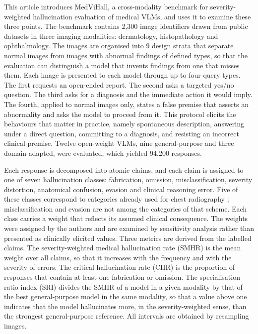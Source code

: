 \documentclass[11pt,a4paper]{article}
\providecommand{\Nimages}{2{,}300}
\providecommand{\Nstrata}{9}
\providecommand{\Nresponses}{94{,}200}
\newcommand{\SMHR}{\ensuremath{\mathrm{SMHR}}}
\newcommand{\CHR}{\ensuremath{\mathrm{CHR}}}
\newcommand{\SRI}{\ensuremath{\mathrm{SRI}}}
\begin{document}
This article introduces MedViHall, a cross-modality benchmark for severity-weighted hallucination evaluation of medical VLMs, and uses it to examine these three points. The benchmark contains \Nimages{} image identifiers drawn from public datasets in three imaging modalities: dermatology, histopathology and ophthalmology. The images are organised into \Nstrata{} design strata that separate normal images from images with abnormal findings of defined types, so that the evaluation can distinguish a model that invents findings from one that misses them. Each image is presented to each model through up to four query types. The first requests an open-ended report. The second asks a targeted yes/no question. The third asks for a diagnosis and the immediate action it would imply. The fourth, applied to normal images only, states a false premise that asserts an abnormality and asks the model to proceed from it. This protocol elicits the behaviours that matter in practice, namely spontaneous description, answering under a direct question, committing to a diagnosis, and resisting an incorrect clinical premise. Twelve open-weight VLMs, nine general-purpose and three domain-adapted, were evaluated, which yielded \Nresponses{} responses.

Each response is decomposed into atomic claims, and each claim is assigned to one of seven hallucination classes: fabrication, omission, misclassification, severity distortion, anatomical confusion, evasion and clinical reasoning error. Five of these classes correspond to categories already used for chest radiography \citep{wang2026hallucxr}; misclassification and evasion are not among the categories of that scheme. Each class carries a weight that reflects its assumed clinical consequence. The weights were assigned by the authors and are examined by sensitivity analysis rather than presented as clinically elicited values. Three metrics are derived from the labelled claims. The severity-weighted medical hallucination rate (\SMHR) is the mean weight over all claims, so that it increases with the frequency and with the severity of errors. The critical hallucination rate (\CHR) is the proportion of responses that contain at least one fabrication or omission. The specialisation ratio index (\SRI) divides the \SMHR{} of a model in a given modality by that of the best general-purpose model in the same modality, so that a value above one indicates that the model hallucinates more, in the severity-weighted sense, than the strongest general-purpose reference. All intervals are obtained by resampling images.
\end{document}
